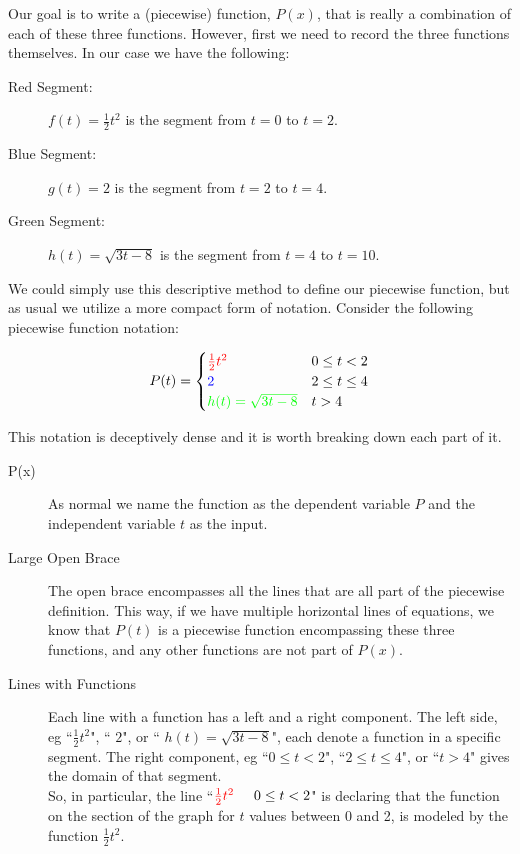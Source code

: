 \documentclass{ximera}
\begin{document}
Our goal is to write a (piecewise) function, $P(x)$, that is really a combination of each of these three functions. However, first we need to record the three functions themselves. In our case we have the following: 
\begin{description}
    \item[Red Segment:] {\color{red} $f(t) = \frac{1}{2}t^2$} is the segment from $t=0$ to $t=2$.
    \item[Blue Segment:] {\color{blue} $g(t) = 2$} is the segment from $t=2$ to $t=4$.
    \item[Green Segment:] {\color{green} $h(t) = \sqrt{3t-8}$} is the segment from $t=4$ to $t=10$.
\end{description}

We could simply use this descriptive method to define our piecewise function, but as usual we utilize a more compact form of notation. Consider the following piecewise function notation:

\[
    P(t) =
        \begin{cases}
            {\color{red}\frac{1}{2}t^2} & 0\leq t < 2 \\
            {\color{blue} 2} & 2 \leq t \leq 4 \\
            {\color{green} h(t) = \sqrt{3t-8}} & t > 4
        \end{cases}
\]

This notation is deceptively dense and it is worth breaking down each part of it. 
\begin{description}
    \item[P(x)] As normal we name the function as the dependent variable $P$ and the independent variable $t$ as the input.
    \item[Large Open Brace] The open brace encompasses all the lines that are all part of the piecewise definition. This way, if we have multiple horizontal lines of equations, we know that $P(t)$ is a piecewise function encompassing these three functions, and any other functions are not part of $P(x)$.
    \item[Lines with Functions] Each line with a function has a left and a right component. The left side, eg ``{\color{red}$\frac{1}{2}t^2$}", ``{\color{blue} $2$}", or ``{\color{green} $h(t) = \sqrt{3t-8}$}", each denote a function in a specific segment. The right component, eg ``$0\leq t < 2$", ``$2 \leq t \leq 4$", or ``$t > 4$" gives the domain of that segment.\\
    So, in particular, the line ``${\color{red}\frac{1}{2}t^2} \hspace{0.5cm} 0\leq t < 2$" is declaring that the function on the section of the graph for $t$ values between 0 and 2, is modeled by the function $\frac{1}{2}t^2$.
\end{description}
\end{document}
